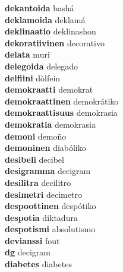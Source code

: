 \textbf{dekantoida } bashá \\
\textbf{deklamoida } deklamá \\
\textbf{deklinaatio } deklinashon \\
\textbf{dekoratiivinen } decorativo \\
\textbf{delata } muri \\
\textbf{delegoida } delegado \\
\textbf{delfiini } dòlfein \\
\textbf{demokraatti } demokrat \\
\textbf{demokraattinen } demokrátiko \\
\textbf{demokraattisuus } demokrasia \\
\textbf{demokratia } demokrasia \\
\textbf{demoni } demoño \\
\textbf{demoninen } diabóliko \\
\textbf{desibeli } decibel \\
\textbf{desigramma } decigram \\
\textbf{desilitra } decilitro \\
\textbf{desimetri } decimetro \\
\textbf{despoottinen } despótiko \\
\textbf{despotia } diktadura \\
\textbf{despotismi } absolutismo \\
\textbf{devianssi } fout \\
\textbf{dg } decigram \\
\textbf{diabetes } diabetes \\
